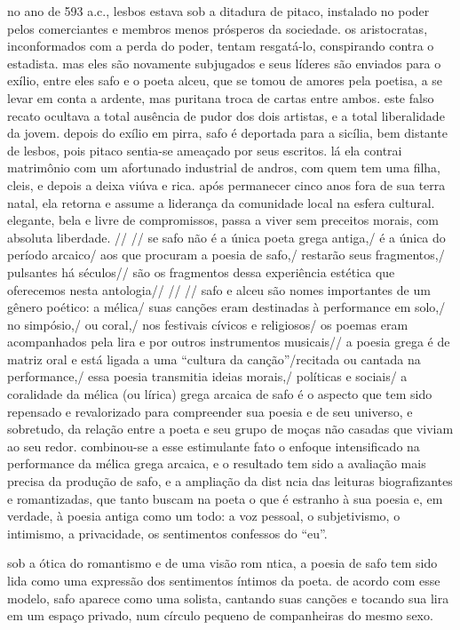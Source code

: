 \documentclass[12pt]{extarticle}
\begin{document}
no ano de 593 a.c., lesbos estava sob a ditadura de pitaco, instalado no poder pelos comerciantes e membros menos prósperos da sociedade. os aristocratas, inconformados com a perda do poder, tentam resgatá-lo, conspirando contra o estadista. mas eles são novamente subjugados e seus líderes são enviados para o exílio, entre eles safo e o poeta alceu, que se tomou de amores pela poetisa, a se levar em conta a ardente, mas puritana troca de cartas entre ambos. este falso recato ocultava a total ausência de pudor dos dois artistas, e a total liberalidade da jovem.
depois do exílio em pirra, safo é deportada para a sicília, bem distante de lesbos, pois pitaco sentia-se ameaçado por seus escritos. lá ela contrai matrimônio com um afortunado industrial de andros, com quem tem uma filha, cleis, e depois a deixa viúva e rica. após permanecer cinco anos fora de sua terra natal, ela retorna e assume a liderança da comunidade local na esfera cultural. elegante, bela e livre de compromissos, passa a viver sem preceitos morais, com absoluta liberdade.
 //
//
se safo não é a única poeta grega antiga,/ é a única do período arcaico/
aos que procuram a poesia de safo,/ restarão seus fragmentos,/ pulsantes há séculos// são os fragmentos dessa experiência estética que oferecemos nesta antologia//
 //
//
safo e alceu são nomes importantes de um gênero poético: a mélica/ suas canções eram destinadas à performance em solo,/  no simpósio,/ ou coral,/ nos festivais cívicos e religiosos/
os poemas eram acompanhados pela lira e por outros instrumentos musicais//
a poesia grega é de matriz oral e está ligada a uma “cultura da canção”/recitada ou cantada na performance,/ essa poesia transmitia ideias morais,/ políticas e sociais/
a coralidade da mélica (ou lírica) grega arcaica de safo é o aspecto que tem sido repensado e revalorizado para compreender sua poesia e de seu universo, e sobretudo, da relação entre a poeta e seu grupo de moças não casadas que viviam ao seu redor.
combinou-se a esse estimulante fato o enfoque intensificado na performance da mélica grega arcaica, e o resultado tem sido a avaliação mais precisa da produção de safo, e a ampliação da dist ncia das leituras biografizantes e romantizadas, que tanto buscam na poeta o que é estranho à sua poesia e, em verdade, à poesia antiga como um todo: a voz pessoal, o subjetivismo, o intimismo, a privacidade, os sentimentos confessos do “eu”. 

sob a ótica do romantismo e de uma visão rom ntica, a poesia de safo tem sido lida como uma expressão dos sentimentos íntimos da poeta. de acordo com esse modelo, safo aparece como uma solista, cantando suas canções e tocando sua lira em um espaço privado, num círculo pequeno de companheiras do mesmo sexo.
\end{document}

